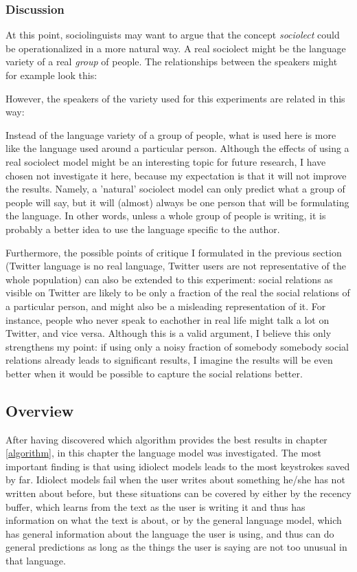 \documentclass[12pt]{article}
\begin{document}
\subsubsection{Discussion}
At this point, sociolinguists may want to argue that the concept \emph{sociolect} could be operationalized in a more natural way. A real sociolect might be the language variety of a real \emph{group} of people. The relationships between the speakers might for example look this:


However, the speakers of the variety used for this experiments are related in this way:


Instead of the language variety of a group of people, what is used here is more like the language used around a particular person. Although the effects of using a real sociolect model might be an interesting topic for future research, I have chosen not investigate it here, because my expectation is that it will not improve the results. Namely, a 'natural' sociolect model can only predict what a group of people will say, but it will (almost) always be one person that will be formulating the language. In other words, unless a whole group of people is writing, it is probably a better idea to use the language specific to the author.


Furthermore, the possible points of critique I formulated in the previous section (Twitter language is no real language, Twitter users are not representative of the whole population) can also be extended to this experiment: social relations as visible on Twitter are likely to be only a fraction of the real the social relations of a particular person, and might also be a misleading representation of it. For instance, people who never speak to eachother in real life might talk a lot on Twitter, and vice versa. Although this is a valid argument, I believe this only strengthens my point: if using only a noisy fraction of somebody somebody social relations already leads to significant results, I imagine the results will be even better when it would be possible to capture the social relations better.

\subsection{Overview}
After having discovered which algorithm provides the best results in chapter \ref{algorithm}, in this chapter the language model was investigated. The most important finding is that using idiolect models leads to the most keystrokes saved by far. Idiolect models fail when the user writes about something he/she has not written about before, but these situations can be covered by either by the recency buffer, which learns from the text as the user is writing it and thus has information on what the text is about, or by the general language model, which has general information about the language the user is using, and thus can do general predictions as long as the things the user is saying are not too unusual in that language. 
\end{document}
